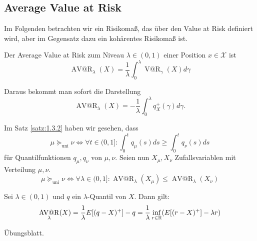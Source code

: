 \documentclass[a4paper,twoside,DIV15,BCOR12mm]{scrbook}
\makeatletter
\newcommand{\cX}{\mathcal X}
\newcommand{\unisucceq}{\succeq_{\text{uni}}}
\DeclareMathOperator{\VatR}{V@R}
\DeclareMathOperator{\AVatR}{AV@R}
\makeatother
\begin{document}
\subsection{Average Value at Risk}
Im Folgenden betrachten wir ein Risikomaß, das über den Value at Risk definiert wird, aber im Gegensatz dazu ein kohärentes Risikomaß ist.
\begin{definition}
Der Average Value at Risk zum Niveau $\lambda\in(0,1)$ einer Position $x\in\cX$ ist 
\[
\AVatR_\lambda(X) = \frac1\lambda \int_0^\lambda \VatR_\gamma(X)d\gamma
\]
\end{definition}

Daraus bekommt man sofort die Darstellung
\[
\AVatR_\lambda(X) = -\frac1\lambda \int_0^\lambda q_X^+(\gamma)d\gamma.
\]

\begin{bemerkung}
Im Satz \ref{satz:1.3.2} haben wir gesehen, dass
\[
\mu\unisucceq \nu \iff \forall t\in(0,1]: \int_0^t q_\mu(s)ds \ge \int_0^t q_\nu(s)ds
\]
für Quantilfunktionen $q_\mu,q_\nu$ von $\mu,\nu$. Seien nun $X_\mu,X_\nu$ Zufallsvariablen mit Verteilung $\mu,\nu$.
\[
\mu\unisucceq \nu \iff \forall \lambda\in(0,1]: \AVatR_\lambda(X_\mu) \le \AVatR_\lambda(X_\nu)
\]
\end{bemerkung}

\begin{lemma}
\label{lemma:1.4.16}Sei $\lambda\in(0,1)$ und $q$ ein $\lambda$-Quantil von $X$. Dann gilt:
\[
\AVatR_\lambda(X) = \frac1\lambda E[(q-X)^+] - q = \frac1\lambda \inf_{r\in\MdR}(E[(r-X)^+]-\lambda r)
\]
\end{lemma}
\begin{beweis}
Übungsblatt.
\end{beweis}
\end{document}
